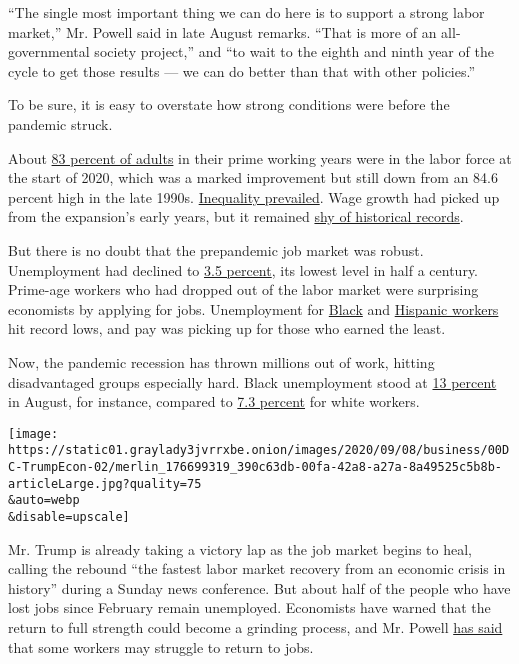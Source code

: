 ``The single most important thing we can do here is to support a strong
labor market,'' Mr. Powell said in late August remarks. ``That is more
of an all-governmental society project,'' and ``to wait to the eighth
and ninth year of the cycle to get those results --- we can do better
than that with other policies.''

To be sure, it is easy to overstate how strong conditions were before
the pandemic struck.

About \href{https://fred.stlouisfed.org/series/LNS11300060}{83 percent
of adults} in their prime working years were in the labor force at the
start of 2020, which was a marked improvement but still down from an
84.6 percent high in the late 1990s.
\href{https://www.pewsocialtrends.org/2020/01/09/trends-in-income-and-wealth-inequality/}{Inequality
prevailed}. Wage growth had picked up from the expansion's early years,
but it remained
\href{https://www.frbatlanta.org/chcs/wage-growth-tracker?panel=2}{shy
of historical records}.

But there is no doubt that the prepandemic job market was robust.
Unemployment had declined to
\href{https://fred.stlouisfed.org/series/UNRATE}{3.5 percent}, its
lowest level in half a century. Prime-age workers who had dropped out of
the labor market were surprising economists by applying for jobs.
Unemployment for
\href{https://www.nytimes3xbfgragh.onion/2020/02/07/business/black-unemployment-wages.html}{Black}
and
\href{https://www.nytimes3xbfgragh.onion/2019/07/01/business/economy/minority-women-hispanics-jobs.html}{Hispanic
workers} hit record lows, and pay was picking up for those who earned
the least.

Now, the pandemic recession has thrown millions out of work, hitting
disadvantaged groups especially hard. Black unemployment stood at
\href{https://fred.stlouisfed.org/series/LNS14000006}{13 percent} in
August, for instance, compared to
\href{https://fred.stlouisfed.org/series/LNS14000003}{7.3 percent} for
white workers.

\texttt{[image: https://static01.graylady3jvrrxbe.onion/images/2020/09/08/business/00DC-TrumpEcon-02/merlin\_176699319\_390c63db-00fa-42a8-a27a-8a49525c5b8b-articleLarge.jpg?quality=75\\\&auto=webp\\\&disable=upscale]}

Mr. Trump is already taking a victory lap as the job market begins to
heal, calling the rebound ``the fastest labor market recovery from an
economic crisis in history'' during a Sunday news conference. But about
half of the people who have lost jobs since February remain unemployed.
Economists have warned that the return to full strength could become a
grinding process, and Mr. Powell
\href{https://www.npr.org/2020/09/04/909590044/transcript-nprs-full-interview-with-fed-chairman-jerome-powell}{has
said} that some workers may struggle to return to jobs.

